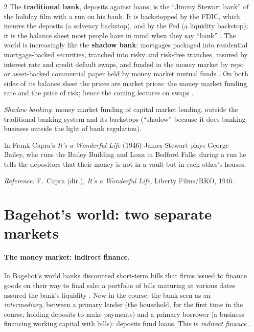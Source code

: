 \begin{paracol}{2}
The \textbf{traditional bank}, deposits against loans, is the ``Jimmy Stewart bank'' of the holiday film with a run on his bank. It is backstopped by the FDIC,
which insures the deposits (a solvency backstop), and by the Fed (a liquidity backstop); it is the balance sheet most people have in mind when they say ``bank''
. The world is increasingly like the \textbf{shadow bank}: mortgages packaged into residential mortgage-backed
securities, tranched into risky and risk-free tranches, insured by interest rate and credit default swaps, and funded in the money market by repo or asset-backed
commercial paper held by money market mutual funds . On both sides of its balance sheet the prices are market prices: the money
market funding rate and the price of risk; hence the coming lectures on swaps .

\begin{definition}
\emph{Shadow banking}: money market funding of capital market lending, outside the traditional banking system and its backstops 
(``shadow'' because it does banking business outside the light of bank regulation).
\end{definition}

\begin{history}
In Frank Capra's \emph{It's a Wonderful Life} (1946) James Stewart plays George Bailey, who runs the Bailey Building and Loan in Bedford Falls; during a run he
tells the depositors that their money is not in a vault but in each other's houses.\par
\emph{Reference:} F.~Capra (dir.), \emph{It's a Wonderful Life}, Liberty Films/RKO, 1946.
\end{history}

\section{Bagehot's world: two separate markets}\label{sec:di-bagehot}

\paragraph{The money market: indirect finance.} In Bagehot's world banks discounted short-term bills that firms issued to finance goods on their way to final sale;
a portfolio of bills maturing at various dates assured the bank's liquidity . New in the course: the bank seen as an
\emph{intermediary}, between a primary lender (the household, for the first time in the course, holding deposits to make payments) and a primary borrower (a
business financing working capital with bills): deposits fund loans. This is \emph{indirect finance} .


\end{paracol}
